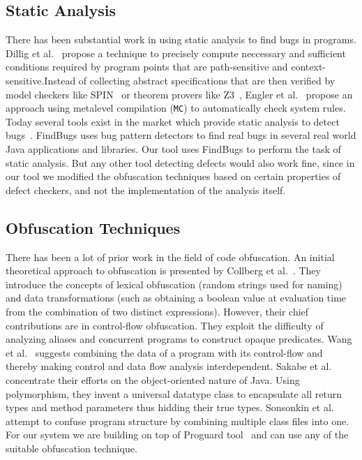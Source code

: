 \documentclass[conference]{IEEEtran}
\begin{document}
\subsection{Static Analysis}
There has been substantial work in using static analysis to find bugs in programs. Dillig et al.~\cite{dillig} propose a technique to precisely compute neccessary and sufficient 
conditions required by program points that are path-sensitive and context-sensitive.Instead of collecting abstract specifications that are then verified by model checkers like 
SPIN~\cite{spin} or theorem provers like Z3~\cite{z3}, Engler et al.~\cite{engler} propose an approach using metalevel compilation ({\tt MC}) to automatically check system rules. 
Today several tools exist in the market which provide 
static analysis to detect bugs~\cite{coverity,klocwork,parasoft,findbugs,chess,saturn}. FindBugs \cite{findbugs} uses bug pattern detectors to find real bugs in several real world 
Java applications and libraries. Our tool uses FindBugs to perform the task of static analysis. But any other tool detecting defects would also work fine, since in our tool we 
modified the obfuscation techniques based on certain properties of defect checkers, and not the implementation of the analysis itself.

\subsection{Obfuscation Techniques}
There has been a lot of prior work in the field of code obfuscation. An initial theoretical approach to obfuscation is presented by Collberg et al.~\cite{collberg}. 
They introduce the concepts of lexical obfuscation (random strings used for naming) and data transformations (such as obtaining a boolean value at evaluation time from the combination 
of two distinct expressions). However, their chief contributions are in control-flow obfuscation. They exploit the difficulty of analyzing aliases and concurrent programs to 
construct opaque predicates. Wang et al.~\cite{wang} suggests combining the data of a program with its control-flow and thereby making control and data flow analysis interdependent. 
Sakabe et al.~\cite{sakabe} concentrate their efforts on the object-oriented nature of Java. Using polymorphism, they invent a universal datatype class to encapsulate all return types 
and method parameters thus hidding their true types. Sonsonkin et al.~\cite{sonsonkin} attempt to confuse program structure by combining multiple class files into one. For our system 
we are building on top of Proguard tool~\cite{proguard} and can use any of the suitable obfuscation technique.
\end{document}
